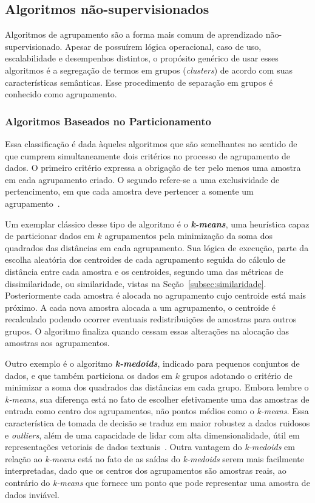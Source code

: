 \documentclass{SBCbookchapter}
\begin{document}
\subsection{Algoritmos não-supervisionados}

Algoritmos de agrupamento são a forma mais comum de aprendizado não-supervisionado. Apesar de possuírem lógica operacional, caso de uso, escalabilidade e desempenhos distintos, o propósito genérico de usar esses algoritmos é a segregação de termos em grupos (\textit{clusters}) de acordo com suas características semânticas. Esse procedimento de separação em grupos é conhecido como agrupamento.

\subsubsection{Algoritmos Baseados no Particionamento}
\label{subsubsec:particionamento}

Essa classificação é dada àqueles algoritmos que são semelhantes no sentido de que cumprem simultaneamente dois critérios no processo de agrupamento de dados. O primeiro critério expressa a obrigação de ter pelo menos uma amostra em cada agrupamento criado. O segundo refere-se a uma exclusividade de pertencimento, em que cada amostra deve pertencer a somente um agrupamento~\cite{xu2005survey,fahad2014survey}. 

Um exemplar clássico desse tipo de algoritmo é o \textbf{\textit{k-means}}, uma heurística capaz de particionar dados em $k$ agrupamentos pela minimização da soma dos quadrados das distâncias em cada agrupamento. Sua lógica de execução, parte da escolha aleatória dos centroides de cada agrupamento seguida do cálculo de distância entre cada amostra e os centroides, segundo uma das métricas de dissimilaridade, ou similaridade, vistas na Seção~\ref{subsec:similaridade}. Posteriormente cada amostra é alocada no agrupamento cujo centroide está mais próximo. A cada nova amostra alocada a um agrupamento, o centroide é recalculado podendo ocorrer eventuais redistribuições de amostras para outros grupos. O algoritmo finaliza quando cessam essas alterações na alocação das amostras aos agrupamentos.

Outro exemplo é o algoritmo \textbf{\textit{k-medoids}}, indicado para pequenos conjuntos de dados, e que também particiona os dados em $ k $ grupos adotando o critério de minimizar a soma dos quadrados das distâncias em cada grupo. Embora lembre o \textit{k-means}, sua diferença está no fato de escolher efetivamente uma das amostras de entrada como centro dos agrupamentos, não pontos médios como o \textit{k-means}. Essa característica de tomada de decisão se traduz em maior robustez a dados ruidosos e \textit{outliers}, além de uma capacidade de lidar com alta dimensionalidade, útil em representações vetoriais de dados textuais~\cite{xu2005survey, fahad2014survey}. Outra vantagem do \textit{k-medoids} em relação ao \textit{k-means} está no fato de as saídas do \textit{k-medoids} serem mais facilmente interpretadas, dado que os centros dos agrupamentos são amostras reais, ao contrário do \textit{k-means} que fornece um ponto que pode representar uma amostra de dados inviável.
\end{document}

